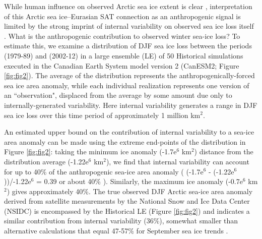 \documentclass{nature}
\begin{document}
While human influence on observed Arctic sea ice extent is clear \cite{min08}, interpretation of this Arctic sea ice--Eurasian SAT connection as an anthropogenic signal is limited by the strong imprint of internal variability on observed sea ice loss itself \cite{swart15}. What is the anthropogenic contribution to observed winter sea-ice loss? To estimate this, we examine a distribution of DJF sea ice loss between the periods (1979-89) and (2002-12) in a large ensemble (LE) of 50 Historical simulations executed in the Canadian Earth System model version 2 (CanESM2; Figure \ref{fig:fig2}). The average of the distribution represents the anthropogenically-forced sea ice area anomaly, while each individual realization represents one version of an ``observation", displaced from the average by some amount due only to internally-generated variability. Here internal variability generates a range in DJF sea ice loss over this time period of approximately 1 million km$^2$. 

An estimated upper bound on the contribution of internal variability to a sea-ice area anomaly can be made using the extreme end-points of the distribution in Figure \ref{fig:fig2}: taking the minimum ice anomaly (-1.7e$^6$ km$^2$) distance from the distribution average (-1.22e$^6$ km$^2$), we find that internal variability can account for up to 40\% of the anthropogenic sea-ice area anomaly ( (-1.7e$^6$ - (-1.22e$^6$))/-1.22e$^6$ = 0.39 or about 40\% ). Similarly, the maximum ice anomaly (-0.7e$^6$ km$^2$) gives approximately 40\%. The true observed DJF Arctic sea-ice area anomaly derived from satellite measurements by the National Snow and Ice Data Center (NSIDC) is encompassed by the Historical LE (Figure \ref{fig:fig2}) and indicates a similar contribution from internal variability (36\%), somewhat smaller than alternative calculations that equal 47-57\% for September sea ice trends \cite{kay11,stroeve07}.



\end{document}
